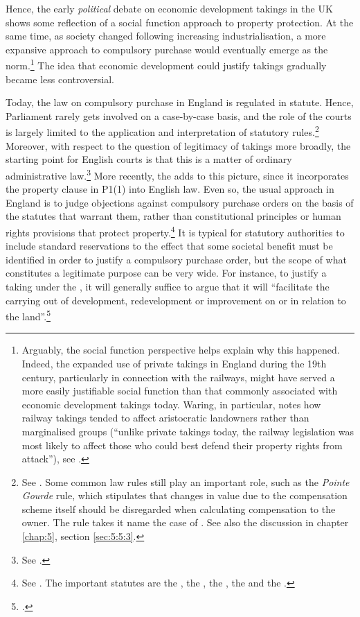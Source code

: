 Hence, the early {\it political} debate on economic development takings in the UK shows some reflection of a social function approach to property protection. At the same time, as society changed following increasing industrialisation, a more expansive approach to compulsory purchase would eventually emerge as the norm.\footnote{Arguably, the social function perspective helps explain why this happened. Indeed, the expanded use of private takings in England during the 19th century, particularly in connection with the railways, might have served a more easily justifiable social function than that commonly associated with economic development takings today. Waring, in particular, notes how railway takings tended to affect aristocratic landowners rather than marginalised groups (``unlike private takings today, the railway legislation was most likely to affect those who could best defend their property rights from attack''), see \cite[111]{waring09}.} The idea that economic development could justify takings gradually became less controversial.

Today, the law on compulsory purchase in England is regulated in statute. Hence, Parliament rarely gets involved on a case-by-case basis, and the role of the courts is largely limited to the application and interpretation of statutory rules.\footnote{See \cite[116-121]{waring09}. Some common law rules still play an important role, such as the {\it Pointe Gourde} rule, which stipulates that changes in value due to the compensation scheme itself should be disregarded when calculating compensation to the owner. The rule takes it name the case of \cite{gourde47}. See also the discussion in chapter \ref{chap:5}, section \ref{sec:5:5:3}.} Moreover, with respect to the question of legitimacy of takings more broadly, the starting point for English courts is that this is a matter of ordinary administrative law.\footnote{See \cite{taggart98}.} More recently, the \cite{hra98} adds to this picture, since it incorporates the property clause in P1(1) into English law. Even so, the usual approach in England is to judge objections against compulsory purchase orders on the basis of the statutes that warrant them, rather than constitutional principles or human rights provisions that protect property.\footnote{See \cite[121-132]{waring09}. The important statutes are the \cite{ala81}, the \cite{lca61}, the \cite{cpa65}, the \cite{tcpa90} and the \cite{pcpa04}.} It is typical for statutory authorities to include standard reservations to the effect that some societal benefit must be identified in order to justify a compulsory purchase order, but the scope of what constitutes a legitimate purpose can be very wide. For instance, to justify a taking under the \cite{tcpa90}, it will generally suffice to argue that it will ``facilitate the carrying out of development, redevelopment or improvement on or in relation to the land''.\dni\footcite[226]{tcpa90}

